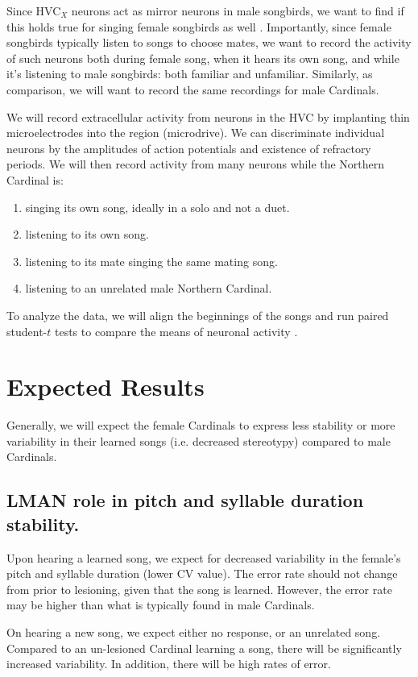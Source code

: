 \documentclass[12pt]{article}
\begin{document}
Since HVC$_X$ neurons act as mirror neurons in male songbirds, we want to find if this holds true for singing female songbirds as well \cite{Mooney2}. Importantly, since female songbirds typically listen to songs to choose mates, we want to record the activity of such neurons both during female song, when it hears its own song, and while it’s listening to male songbirds: both familiar and unfamiliar. Similarly, as comparison, we will want to record the same recordings for male Cardinals.

We will record extracellular activity from neurons in the HVC by implanting thin microelectrodes into the region (microdrive). We can discriminate individual neurons by the amplitudes of action potentials and existence of refractory periods. We will then record activity from many neurons while the Northern Cardinal is:
\begin{enumerate}
    \item singing its own song, ideally in a solo and not a duet.
    \item listening to its own song.
    \item listening to its mate singing the same mating song.
    \item listening to an unrelated male Northern Cardinal.
\end{enumerate}

To analyze the data, we will align the beginnings of the songs and run paired student-$t$ tests to compare the means of neuronal activity \cite{Prather}.

\section{Expected Results}
Generally, we will expect the female Cardinals to express less stability or more variability in their learned songs (i.e. decreased stereotypy) compared to male Cardinals.

\subsection{LMAN role in pitch and syllable duration stability.}
Upon hearing a learned song, we expect for decreased variability in the female's pitch and syllable duration (lower CV value). The error rate should not change from prior to lesioning, given that the song is learned. However, the error rate may be higher than what is typically found in male Cardinals.

On hearing a new song, we expect either no response, or an unrelated song. Compared to an un-lesioned Cardinal learning a song, there will be significantly increased variability. In addition, there will be high rates of error.
\end{document}
